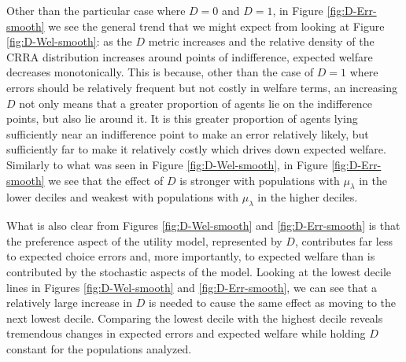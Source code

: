 \documentclass[../main.tex]{subfiles}
\begin{document}
\addtocounter{footnote}{-1}

Other than the particular case where $D=0$ and $D=1$, in Figure \ref{fig:D-Err-smooth} we see the general trend that we might expect from looking at Figure \ref{fig:D-Wel-smooth}: as the $D$ metric increases and the relative density of the CRRA distribution increases around points of indifference, expected welfare decreases monotonically.
This is because, other than the case of $D=1$ where errors should be relatively frequent but not costly in welfare terms, an increasing $D$ not only means that a greater proportion of agents lie on the indifference points, but also lie around it.
It is this greater proportion of agents lying sufficiently near an indifference point to make an error relatively likely, but sufficiently far to make it relatively costly which drives down expected welfare.
Similarly to what was seen in Figure \ref{fig:D-Wel-smooth}, in Figure \ref{fig:D-Err-smooth} we see that the effect of $D$ is stronger with populations with $\mu_\lambda$ in the lower deciles and weakest with populations with $\mu_\lambda$ in the higher deciles.

What is also clear from Figures \ref{fig:D-Wel-smooth} and \ref{fig:D-Err-smooth} is that the preference aspect of the utility model, represented by $D$, contributes far less to expected choice errors and, more importantly, to expected welfare than is contributed by the stochastic aspects of the model.
Looking at the lowest decile lines in Figures \ref{fig:D-Wel-smooth} and \ref{fig:D-Err-smooth}, we can see that a relatively large increase in $D$ is needed to cause the same effect as moving to the next lowest decile.
Comparing the lowest decile with the highest decile reveals tremendous changes in expected errors and expected welfare while holding $D$ constant for the populations analyzed.
\end{document}
